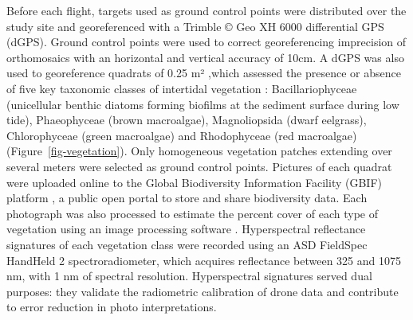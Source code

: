 \documentclass[
  number]{elsarticle}
\begin{document}
Before each flight, targets used as ground control points were
distributed over the study site and georeferenced with a Trimble © Geo
XH 6000 differential GPS (dGPS). Ground control points were used to
correct georeferencing imprecision of orthomosaics with an horizontal
and vertical accuracy of 10cm. A dGPS was also used to georeference
quadrats of 0.25 m² ,which assessed the presence or absence of five key
taxonomic classes of intertidal vegetation : Bacillariophyceae
(unicellular benthic diatoms forming biofilms at the sediment surface
during low tide), Phaeophyceae (brown macroalgae), Magnoliopsida (dwarf
eelgrass), Chlorophyceae (green macroalgae) and Rhodophyceae (red
macroalgae) (Figure~\ref{fig-vegetation}). Only homogeneous vegetation
patches extending over several meters were selected as ground control
points. Pictures of each quadrat were uploaded online to the Global
Biodiversity Information Facility (GBIF) platform \citep{BedeGbif}, a
public open portal to store and share biodiversity data. Each photograph
was also processed to estimate the percent cover of each type of
vegetation using an image processing software
\citep[ImageJ,][]{schneider2012nih}. Hyperspectral reflectance
signatures of each vegetation class were recorded using an ASD FieldSpec
HandHeld 2 spectroradiometer, which acquires reflectance between 325 and
1075 nm, with 1 nm of spectral resolution. Hyperspectral signatures
served dual purposes: they validate the radiometric calibration of drone
data and contribute to error reduction in photo interpretations.
\end{document}
